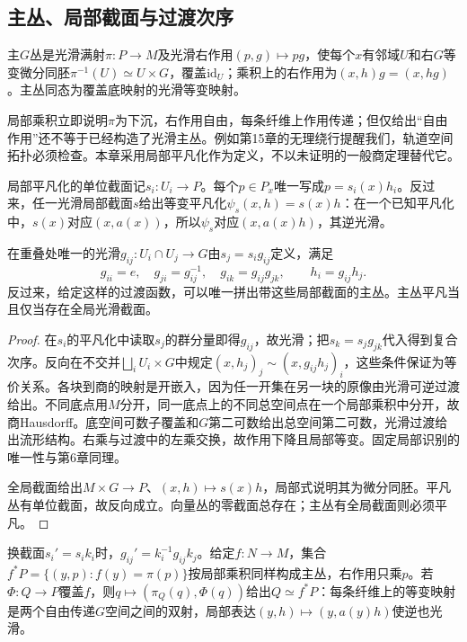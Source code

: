 \subsection{主丛、局部截面与过渡次序}
\begin{definition}\label{def:principal-bundle}
主$G$丛是光滑满射$\pi:P\to M$及光滑右作用$(p,g)\mapsto pg$，使每个$x$有邻域$U$和右$G$等变微分同胚$\pi^{-1}(U)\simeq U\times G$，覆盖$\mathrm{id}_U$；乘积上的右作用为$(x,h)g=(x,hg)$。主丛同态为覆盖底映射的光滑等变映射。
\end{definition}
局部乘积立即说明$\pi$为下沉，右作用自由，每条纤维上作用传递；但仅给出“自由作用”还不等于已经构造了光滑主丛。例如第15章的无理绕行提醒我们，轨道空间拓扑必须检查。本章采用局部平凡化作为定义，不以未证明的一般商定理替代它。

局部平凡化的单位截面记$s_i:U_i\to P$。每个$p\in P_x$唯一写成$p=s_i(x)h_i$。反过来，任一光滑局部截面$s$给出等变平凡化$\psi_s(x,h)=s(x)h$：在一个已知平凡化中，$s(x)$对应$(x,a(x))$，所以$\psi_s$对应$(x,a(x)h)$，其逆光滑。

\begin{proposition}\label{prop:principal-cocycle}
在重叠处唯一的光滑$g_{ij}:U_i\cap U_j\to G$由$s_j=s_i g_{ij}$定义，满足
\begin{equation}\label{eq:principal-cocycle}
 g_{ii}=e,\quad g_{ji}=g_{ij}^{-1},\quad
 g_{ik}=g_{ij}g_{jk},\qquad h_i=g_{ij}h_j.
\end{equation}
反过来，给定这样的过渡函数，可以唯一拼出带这些局部截面的主丛。主丛平凡当且仅当存在全局光滑截面。
\end{proposition}
\begin{proof}
在$s_i$的平凡化中读取$s_j$的群分量即得$g_{ij}$，故光滑；把$s_k=s_jg_{jk}$代入得到复合次序。反向在不交并$\bigsqcup_iU_i\times G$中规定$(x,h_j)_j\sim(x,g_{ij}h_j)_i$，这些条件保证为等价关系。各块到商的映射是开嵌入，因为任一开集在另一块的原像由光滑可逆过渡给出。不同底点用$M$分开，同一底点上的不同总空间点在一个局部乘积中分开，故商Hausdorff。底空间可数子覆盖和$G$第二可数给出总空间第二可数，光滑过渡给出流形结构。右乘与过渡中的左乘交换，故作用下降且局部等变。固定局部识别的唯一性与第6章同理。

全局截面给出$M\times G\to P$、$(x,h)\mapsto s(x)h$，局部式说明其为微分同胚。平凡丛有单位截面，故反向成立。向量丛的零截面总存在；主丛有全局截面则必须平凡。
\end{proof}
换截面$s_i'=s_i k_i$时，$g_{ij}'=k_i^{-1}g_{ij}k_j$。给定$f:N\to M$，集合$f^*P=\{(y,p):f(y)=\pi(p)\}$按局部乘积同样构成主丛，右作用只乘$p$。若$\Phi:Q\to P$覆盖$f$，则$q\mapsto(\pi_Q(q),\Phi(q))$给出$Q\simeq f^*P$：每条纤维上的等变映射是两个自由传递$G$空间之间的双射，局部表达$(y,h)\mapsto(y,a(y)h)$使逆也光滑。

